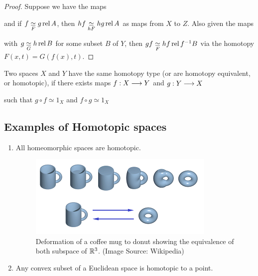 \begin{proof}
    Suppose we have the maps
    \begin{center}
    \end{center}
    and if $f \underset{F}{\simeq} g \operatorname{rel} A$, then $hf \underset{hF}{\simeq} hg \operatorname{rel} A$ as maps from $X$ to $Z$. Also given the maps
    \begin{center}
    \end{center}
    with $g \underset{G}{\simeq} h \operatorname{rel} B$ for some subset $B$ of $Y$, then $gf \underset{F}{\simeq} hf \operatorname{rel} f^{-1} B$ via the homotopy $F(x,t) = G(f(x), t)$.
\end{proof}

\begin{defn}
    Two spaces $X$ and $Y$ have the same homotopy type (or are homotopy equivalent, or homotopic), if there exists maps $f: X \longrightarrow Y$ and $g : Y \longrightarrow X$
    \begin{center}
    \end{center}
    such that $g \circ f \simeq 1_X$ and $f \circ g \simeq 1_X$
\end{defn}


\subsection*{Examples of Homotopic spaces}
\begin{enumerate}
    \item All homeomorphic spaces are homotopic.
          \begin{figure}[H]
              \centering
              \includegraphics[scale=1]{images/mug-and-donut-homotopy-equivalence}
              \caption[Deformation of a coffee mug to donut showing the equivalence of both subspace of $\RR^3$]{Deformation of a coffee mug to donut showing the equivalence of both subspace of $\RR^3$. (Image Source: Wikipedia)}\label{fig:figure}
          \end{figure}
    \item Any convex subset of a Euclidean space is homotopic to a point.
\end{enumerate}

